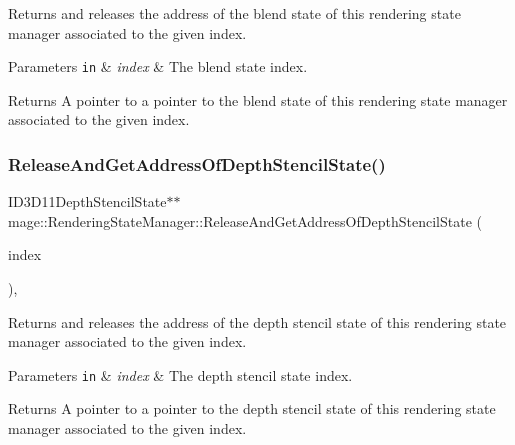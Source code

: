Returns and releases the address of the blend state of this rendering state manager associated to the given index.


\begin{DoxyParams}[1]{Parameters}
\mbox{\tt in}  & {\em index} & The blend state index. \\
\hline
\end{DoxyParams}
\begin{DoxyReturn}{Returns}
A pointer to a pointer to the blend state of this rendering state manager associated to the given index. 
\end{DoxyReturn}
\hypertarget{classmage_1_1_rendering_state_manager_a2387df8ca417a4e743551e9a59af19de}{}\label{classmage_1_1_rendering_state_manager_a2387df8ca417a4e743551e9a59af19de} 
\subsubsection{\texorpdfstring{Release\+And\+Get\+Address\+Of\+Depth\+Stencil\+State()}{ReleaseAndGetAddressOfDepthStencilState()}}
{\footnotesize\ttfamily I\+D3\+D11\+Depth\+Stencil\+State$\ast$$\ast$ mage\+::\+Rendering\+State\+Manager\+::\+Release\+And\+Get\+Address\+Of\+Depth\+Stencil\+State (\begin{DoxyParamCaption}\item[{\hyperlink{classmage_1_1_rendering_state_manager_abcfd0e984d2ba2710320882430d6871a}{Depth\+Stencil\+State\+Index}}]{index }\end{DoxyParamCaption})\hspace{0.3cm}{\ttfamily [private]}, {\ttfamily [noexcept]}}

Returns and releases the address of the depth stencil state of this rendering state manager associated to the given index.


\begin{DoxyParams}[1]{Parameters}
\mbox{\tt in}  & {\em index} & The depth stencil state index. \\
\hline
\end{DoxyParams}
\begin{DoxyReturn}{Returns}
A pointer to a pointer to the depth stencil state of this rendering state manager associated to the given index. 
\end{DoxyReturn}
\hypertarget{classmage_1_1_rendering_state_manager_a6328d147d3de27e9be2def38cdee12e2}{}\label{classmage_1_1_rendering_state_manager_a6328d147d3de27e9be2def38cdee12e2} 
